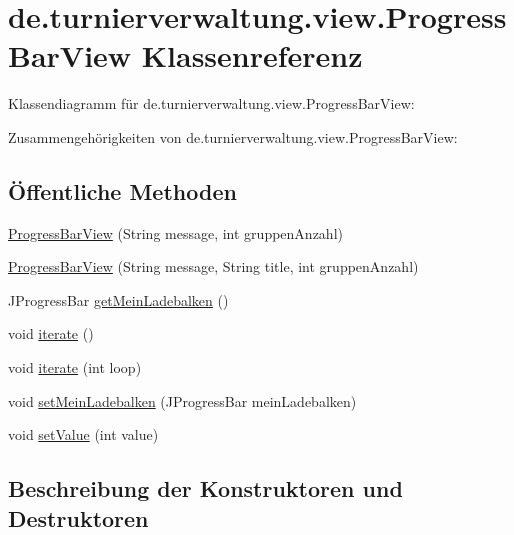 \hypertarget{classde_1_1turnierverwaltung_1_1view_1_1_progress_bar_view}{}\section{de.\+turnierverwaltung.\+view.\+Progress\+Bar\+View Klassenreferenz}
\label{classde_1_1turnierverwaltung_1_1view_1_1_progress_bar_view}


Klassendiagramm für de.\+turnierverwaltung.\+view.\+Progress\+Bar\+View\+:


Zusammengehörigkeiten von de.\+turnierverwaltung.\+view.\+Progress\+Bar\+View\+:
\subsection*{Öffentliche Methoden}
\begin{DoxyCompactItemize}
\item 
\hyperlink{classde_1_1turnierverwaltung_1_1view_1_1_progress_bar_view_acfa60904b987f22a96faab380e1ca127}{Progress\+Bar\+View} (String message, int gruppen\+Anzahl)
\item 
\hyperlink{classde_1_1turnierverwaltung_1_1view_1_1_progress_bar_view_af34d4e0307129c9fdeb88af559415885}{Progress\+Bar\+View} (String message, String title, int gruppen\+Anzahl)
\item 
J\+Progress\+Bar \hyperlink{classde_1_1turnierverwaltung_1_1view_1_1_progress_bar_view_ac0ddb3fae235af5291c0425c8b53c081}{get\+Mein\+Ladebalken} ()
\item 
void \hyperlink{classde_1_1turnierverwaltung_1_1view_1_1_progress_bar_view_ae8bb10bc5eac8d24c044f4a6ee078209}{iterate} ()
\item 
void \hyperlink{classde_1_1turnierverwaltung_1_1view_1_1_progress_bar_view_a5e974c8cb0bc4e4c7c940508278ddb85}{iterate} (int loop)
\item 
void \hyperlink{classde_1_1turnierverwaltung_1_1view_1_1_progress_bar_view_af0fd0f42790ded49671190578cfb0231}{set\+Mein\+Ladebalken} (J\+Progress\+Bar mein\+Ladebalken)
\item 
void \hyperlink{classde_1_1turnierverwaltung_1_1view_1_1_progress_bar_view_a2228129913dd38a87777dbf7858b7310}{set\+Value} (int value)
\end{DoxyCompactItemize}


\subsection{Beschreibung der Konstruktoren und Destruktoren}
